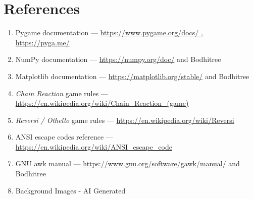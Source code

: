 \documentclass[12pt]{article}
\begin{document}
\section{References}

\begin{enumerate}[leftmargin=*, itemsep=2pt]
  \item Pygame documentation — \url{https://www.pygame.org/docs/ }, 
  \url{https://pyga.me/}
  \item NumPy documentation — \url{https://numpy.org/doc/} and Bodhitree
  \item Matplotlib documentation — \url{https://matplotlib.org/stable/} and Bodhitree
  \item \textit{Chain Reaction} game rules — \url{https://en.wikipedia.org/wiki/Chain_Reaction_(game)}
  \item \textit{Reversi / Othello} game rules — \url{https://en.wikipedia.org/wiki/Reversi}
  \item ANSI escape codes reference — \url{https://en.wikipedia.org/wiki/ANSI_escape_code}
  \item GNU awk manual — \url{https://www.gnu.org/software/gawk/manual/} and Bodhitree
  \item Background Images - AI Generated
\end{enumerate}
\end{document}
